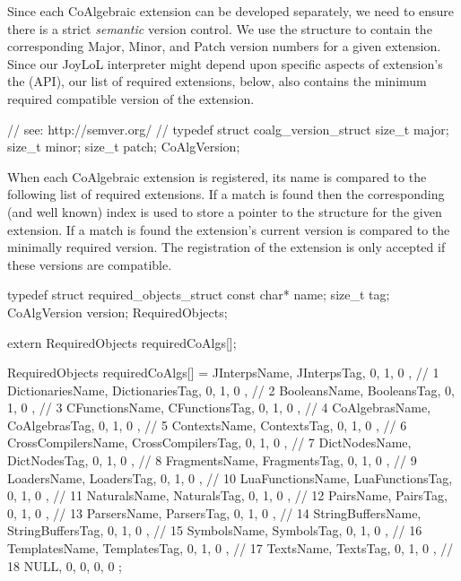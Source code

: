 Since each CoAlgebraic extension can be developed separately, we need to 
ensure there is a strict \emph{semantic} version control. We use the 
 structure to contain the corresponding Major, Minor, 
and Patch version numbers for a given extension. Since our JoyLoL 
interpreter might depend upon specific aspects of extension's the 
 (API), our list of required 
extensions, below, also contains the minimum required compatible version 
of the extension. 

\startCHeader
// see: http://semver.org/
//
typedef struct coalg_version_struct {
  size_t major;
  size_t minor;
  size_t patch;
} CoAlgVersion;
\stopCHeader

When each CoAlgebraic extension is registered, its name is compared to the 
following list of required extensions. If a match is found then the 
corresponding (and well known) index is used to store a pointer to the 
 structure for the given extension. If a match is found 
the extension's current version is compared to the minimally required 
version. The registration of the extension is only accepted if these 
versions are compatible. 

\startCHeader
typedef struct required_objects_struct {
  const char*  name;
  size_t       tag;
  CoAlgVersion version;
} RequiredObjects;

extern RequiredObjects requiredCoAlgs[];
\stopCHeader
{}

\startCCode
RequiredObjects requiredCoAlgs[] = {
  { JInterpsName,       JInterpsTag,       {0, 1, 0 }}, //  1
  { DictionariesName,   DictionariesTag,   {0, 1, 0 }}, //  2
  { BooleansName,       BooleansTag,       {0, 1, 0 }}, //  3
  { CFunctionsName,     CFunctionsTag,     {0, 1, 0 }}, //  4
  { CoAlgebrasName,     CoAlgebrasTag,     {0, 1, 0 }}, //  5
  { ContextsName,       ContextsTag,       {0, 1, 0 }}, //  6
  { CrossCompilersName, CrossCompilersTag, {0, 1, 0 }}, //  7
  { DictNodesName,      DictNodesTag,      {0, 1, 0 }}, //  8
  { FragmentsName,      FragmentsTag,      {0, 1, 0 }}, //  9
  { LoadersName,        LoadersTag,        {0, 1, 0 }}, // 10
  { LuaFunctionsName,   LuaFunctionsTag,   {0, 1, 0 }}, // 11
  { NaturalsName,       NaturalsTag,       {0, 1, 0 }}, // 12
  { PairsName,          PairsTag,          {0, 1, 0 }}, // 13
  { ParsersName,        ParsersTag,        {0, 1, 0 }}, // 14
  { StringBuffersName,  StringBuffersTag,  {0, 1, 0 }}, // 15
  { SymbolsName,        SymbolsTag,        {0, 1, 0 }}, // 16
  { TemplatesName,      TemplatesTag,      {0, 1, 0 }}, // 17
  { TextsName,          TextsTag,          {0, 1, 0 }}, // 18
  { NULL,               0,                 {0, 0, 0 }}
};
\stopCCode

